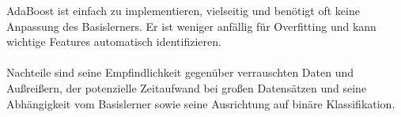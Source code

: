 AdaBoost ist einfach zu implementieren, vielseitig und benötigt oft keine Anpassung des Basislerners.
Er ist weniger anfällig für Overfitting und kann wichtige Features automatisch identifizieren.\\\\
Nachteile sind seine Empfindlichkeit gegenüber verrauschten Daten und Außreißern, der potenzielle Zeitaufwand bei großen
Datensätzen und seine Abhängigkeit vom Basislerner sowie seine Ausrichtung auf binäre Klassifikation.